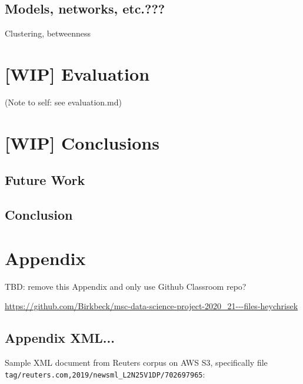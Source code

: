 \documentclass[11pt]{article}
\begin{document}
\subsection{Models, networks, etc.???}

Clustering, betweenness

\section{[WIP] Evaluation}

(Note to self: see evaluation.md)


\section{[WIP] Conclusions}
\subsection{Future Work}
\subsection{Conclusion}


\newpage

\section{Appendix}

TBD: remove this Appendix and only use Github Classroom repo?

\url{https://github.com/Birkbeck/msc-data-science-project-2020_21---files-heychrisek}

\subsection{Appendix XML...}
\label{sec:AppendixXML}
Sample XML document from Reuters corpus on AWS S3, specifically file \lstinline{tag/reuters.com,2019/newsml_L2N25V1DP/702697965}:
\\
\end{document}
